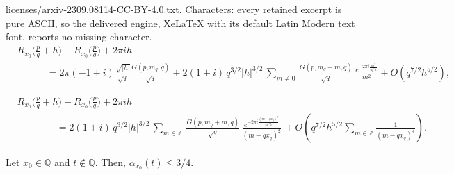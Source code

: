 \documentclass[10pt,a4paper]{amsart}
\begin{document}
licenses/arxiv-2309.08114-CC-BY-4.0.txt. Characters: every retained excerpt is pure ASCII, so the delivered engine, XeLaTeX with its default Latin Modern text font, reports no missing character.
	\begin{equation}\label{eq:Asymptotic_xq_Equal_0}
\begin{split}
&R_{x_0}\Big( \frac{p}{q} + h \Big) - R_{x_0}\Big( \frac{p}{q} \Big) + 2\pi i h   \\
& \qquad   \quad = 2\pi (- 1 \pm i) \frac{\sqrt{|h|}}{\sqrt{q}} \frac{ G(p,m_q,q)}{\sqrt{q}} 
+  2 (1 \pm i) \, q^{3/2} |h|^{3/2} \,\sum_{m \neq 0} \, \frac{ G(p,m_q + m,q)}{\sqrt{q}} \,  \frac{e^{- 2\pi i \frac{m^2}{4 q^2 h}}}{ m^2}
 + O\left( q^{7/2} h^{5/2}  \right),
 \end{split}
\end{equation}

	\begin{equation}\label{eq:Asymptotic_xq_Not_0}
\begin{split}
& R_{x_0}\Big( \frac{p}{q} + h \Big) - R_{x_0}\Big( \frac{p}{q} \Big) + 2\pi i h  \\
& \qquad \qquad 
= 2 (1 \pm i)  \, q^{3/2} |h|^{3/2} \,\sum_{m \in \mathbb Z} \, \frac{ G(p,m_q + m,q)}{\sqrt{q}} \,  
\frac{e^{- 2\pi i \frac{(m - qx_q)^2}{4 q^2 h}}}{ (m - qx_q)^2} \,  + O\left( q^{7/2} h^{5/2} \sum_{m \in \mathbb Z} \frac{1 }{(m - qx_q)^4}  \right).
\end{split}
\end{equation}

\begin{prop}\label{thm:UpperBound34}
Let $x_0 \in \mathbb Q$ and $t \not\in \mathbb Q$. Then, $\alpha_{x_0}(t) \leq  3/4$. 
\end{prop}
\end{document}
